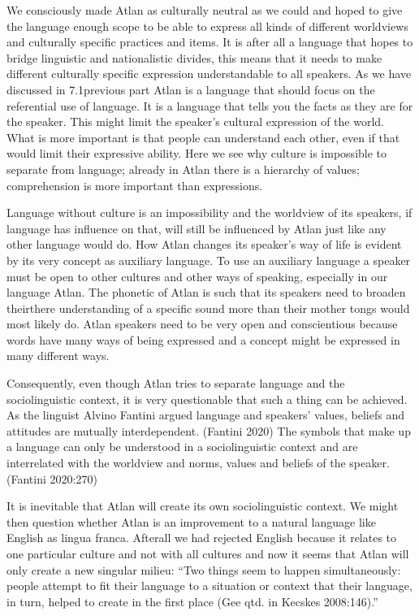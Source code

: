 We consciously made Atlan as culturally neutral as we could and hoped to give the language enough scope to be able to express all kinds of different worldviews and culturally specific practices and items. It is after all a language that hopes to bridge linguistic and nationalistic divides, this means that it needs to make different culturally specific expression understandable to all speakers. As we have discussed in 7.1previous part Atlan is a language that should focus on the referential use of language. It is a language that tells you the facts as they are for the speaker. This might limit the speaker's cultural expression of the world. What is more important is that people can understand each other, even if that would limit their expressive ability. Here we see why culture is impossible to separate from language; already in Atlan there is a hierarchy of values; comprehension is more important than expressions. 					 

Language without culture is an impossibility and the worldview of its speakers, if language has influence on that, will still be influenced by Atlan just like any other language would do. How Atlan changes its speaker's way of life is evident by its very concept as auxiliary language. To use an auxiliary language a speaker must be open to other cultures and other ways of speaking, especially in our language Atlan. The phonetic of Atlan is such that its speakers need to broaden theirthere understanding of a specific sound more than their mother tongs would most likely do. Atlan speakers need to be very open and conscientious because words have many ways of being expressed and a concept might be expressed in many different ways. 									 

Consequently, even though Atlan tries to separate language and the sociolinguistic context, it is very questionable that such a thing can be achieved. As the linguist Alvino Fantini argued language and speakers' values, beliefs and attitudes are mutually interdependent. (Fantini 2020) The symbols that make up a language can only be understood in a sociolinguistic context and are interrelated with the worldview and norms, values and beliefs of the speaker. (Fantini 2020:270)		

It is inevitable that Atlan will create its own sociolinguistic context. We might then question whether Atlan is an improvement to a natural language like English as lingua franca. Afterall we had rejected English because it relates to one particular culture and not with all cultures and now it seems that Atlan will only create a new singular milieu: “Two things seem to happen simultaneously: people attempt to fit their language to a situation or context that their language, in turn, helped to create in the first place (Gee qtd. in Kecskes 2008:146).”  				 

